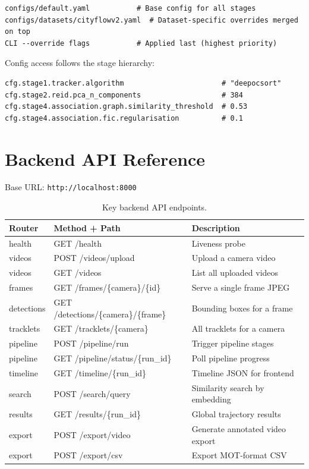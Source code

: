 \begin{verbatim}
configs/default.yaml           # Base config for all stages
configs/datasets/cityflowv2.yaml  # Dataset-specific overrides merged on top
CLI --override flags           # Applied last (highest priority)
\end{verbatim}

Config access follows the stage hierarchy:

\begin{verbatim}
cfg.stage1.tracker.algorithm                       # "deepocsort"
cfg.stage2.reid.pca_n_components                   # 384
cfg.stage4.association.graph.similarity_threshold  # 0.53
cfg.stage4.association.fic.regularisation          # 0.1
\end{verbatim}

\section{Backend API Reference}

Base URL: \texttt{http://localhost:8000}

\begin{table}[htbp]
\centering
\caption{Key backend API endpoints.}
\label{tab:api}
\begin{tabular}{lll}
\hline
\textbf{Router} & \textbf{Method + Path} & \textbf{Description} \\ \hline
health      & GET /health                     & Liveness probe \\
videos      & POST /videos/upload             & Upload a camera video \\
videos      & GET /videos                     & List all uploaded videos \\
frames      & GET /frames/\{camera\}/\{id\}   & Serve a single frame JPEG \\
detections  & GET /detections/\{camera\}/\{frame\} & Bounding boxes for a frame \\
tracklets   & GET /tracklets/\{camera\}       & All tracklets for a camera \\
pipeline    & POST /pipeline/run              & Trigger pipeline stages \\
pipeline    & GET /pipeline/status/\{run\_id\} & Poll pipeline progress \\
timeline    & GET /timeline/\{run\_id\}       & Timeline JSON for frontend \\
search      & POST /search/query              & Similarity search by embedding \\
results     & GET /results/\{run\_id\}        & Global trajectory results \\
export      & POST /export/video              & Generate annotated video export \\
export      & POST /export/csv                & Export MOT-format CSV \\ \hline
\end{tabular}
\end{table}
